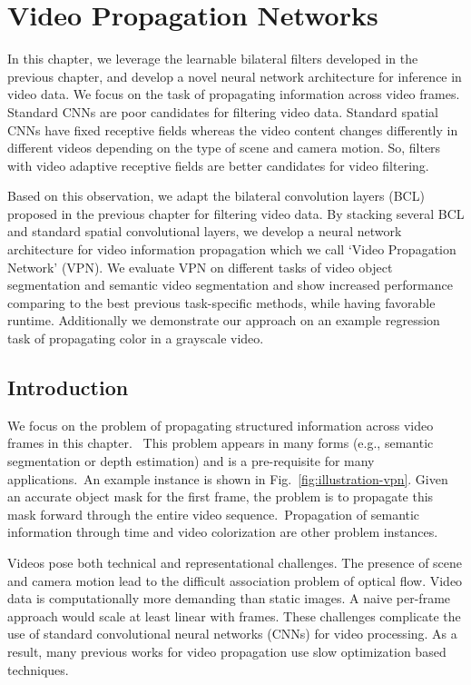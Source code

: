 \chapter{Video Propagation Networks}
\label{chap:vpn}

In this chapter, we leverage the learnable bilateral filters developed in the
previous chapter, and develop a novel neural network architecture for inference
in video data. We focus on the task of propagating information across video
frames. Standard CNNs are poor candidates for filtering video data.
Standard spatial CNNs have fixed receptive fields whereas the video content
changes differently in different videos depending on the type of scene and camera
motion. So, filters with video adaptive receptive fields are better candidates
for video filtering.

Based on this observation, we adapt the bilateral convolution layers (BCL) proposed
in the previous chapter for filtering video data.
By stacking several BCL and standard spatial convolutional
layers, we develop a neural network architecture for video information propagation
which we call `Video Propagation Network' (VPN). We evaluate VPN on different
tasks of video object segmentation and semantic video segmentation
and show increased performance comparing to the best previous task-specific methods,
while having favorable runtime. Additionally we demonstrate our approach on an example
regression task of propagating color in a grayscale video.

\section{Introduction}

We focus on the problem of propagating structured information across video frames in this chapter.
~This problem appears in many forms (e.g., semantic segmentation or depth estimation) and is a pre-requisite for many applications.~An example instance is shown in Fig.~\ref{fig:illustration-vpn}.
Given an accurate object mask for the first frame, the problem is to propagate this mask forward
through the entire video sequence.~Propagation of semantic information through time and video
colorization are other problem instances.

Videos pose both technical and representational challenges.
The presence of scene and camera motion lead to the difficult association problem of optical flow.
Video data is computationally more demanding than static images. A naive per-frame approach would scale at least linear with frames.
These challenges complicate the use of standard convolutional neural networks (CNNs) for video processing.
As a result, many previous works for video propagation use slow optimization based techniques.


